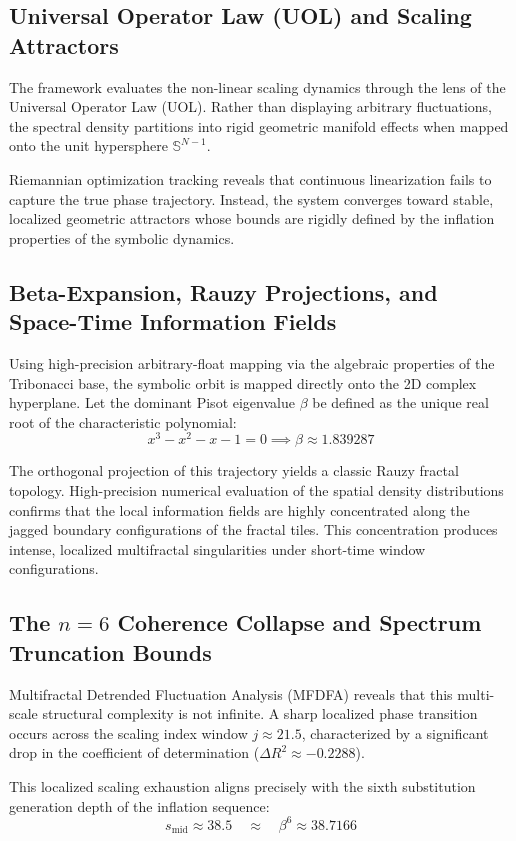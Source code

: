 \subsection{Universal Operator Law (UOL) and Scaling Attractors}
The framework evaluates the non-linear scaling dynamics through the lens of the Universal Operator Law (UOL). Rather than displaying arbitrary fluctuations, the spectral density partitions into rigid geometric manifold effects when mapped onto the unit hypersphere $\mathbb{S}^{N-1}$. 

Riemannian optimization tracking reveals that continuous linearization fails to capture the true phase trajectory. Instead, the system converges toward stable, localized geometric attractors whose bounds are rigidly defined by the inflation properties of the symbolic dynamics.

\subsection{Beta-Expansion, Rauzy Projections, and Space-Time Information Fields}
Using high-precision arbitrary-float mapping via the algebraic properties of the Tribonacci base, the symbolic orbit is mapped directly onto the 2D complex hyperplane. Let the dominant Pisot eigenvalue $\beta$ be defined as the unique real root of the characteristic polynomial:
\[
x^3 - x^2 - x - 1 = 0 \implies \beta \approx 1.839287
\]

The orthogonal projection of this trajectory yields a classic Rauzy fractal topology. High-precision numerical evaluation of the spatial density distributions confirms that the local information fields are highly concentrated along the jagged boundary configurations of the fractal tiles. This concentration produces intense, localized multifractal singularities under short-time window configurations.

\subsection{The $n=6$ Coherence Collapse and Spectrum Truncation Bounds}
Multifractal Detrended Fluctuation Analysis (MFDFA) reveals that this multi-scale structural complexity is not infinite. A sharp localized phase transition occurs across the scaling index window $j \approx 21.5$, characterized by a significant drop in the coefficient of determination ($\Delta R^2 \approx -0.2288$). 

This localized scaling exhaustion aligns precisely with the sixth substitution generation depth of the inflation sequence:
\[
s_{\text{mid}} \approx 38.5 \quad \approx \quad \beta^{6} \approx 38.7166
\]

